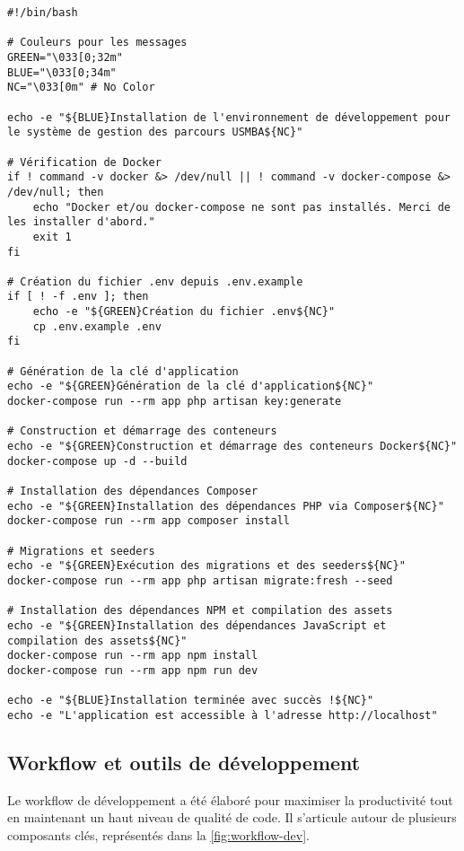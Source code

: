 \documentclass[french,12pt]{report} %
\begin{document}
\begin{lstlisting}[style=phpstyle, caption={setup.sh - Script d'initialisation de l'environnement}]
#!/bin/bash

# Couleurs pour les messages
GREEN="\033[0;32m"
BLUE="\033[0;34m"
NC="\033[0m" # No Color

echo -e "${BLUE}Installation de l'environnement de développement pour le système de gestion des parcours USMBA${NC}"

# Vérification de Docker
if ! command -v docker &> /dev/null || ! command -v docker-compose &> /dev/null; then
    echo "Docker et/ou docker-compose ne sont pas installés. Merci de les installer d'abord."
    exit 1
fi

# Création du fichier .env depuis .env.example
if [ ! -f .env ]; then
    echo -e "${GREEN}Création du fichier .env${NC}"
    cp .env.example .env
fi

# Génération de la clé d'application
echo -e "${GREEN}Génération de la clé d'application${NC}"
docker-compose run --rm app php artisan key:generate

# Construction et démarrage des conteneurs
echo -e "${GREEN}Construction et démarrage des conteneurs Docker${NC}"
docker-compose up -d --build

# Installation des dépendances Composer
echo -e "${GREEN}Installation des dépendances PHP via Composer${NC}"
docker-compose run --rm app composer install

# Migrations et seeders
echo -e "${GREEN}Exécution des migrations et des seeders${NC}"
docker-compose run --rm app php artisan migrate:fresh --seed

# Installation des dépendances NPM et compilation des assets
echo -e "${GREEN}Installation des dépendances JavaScript et compilation des assets${NC}"
docker-compose run --rm app npm install
docker-compose run --rm app npm run dev

echo -e "${BLUE}Installation terminée avec succès !${NC}"
echo -e "L'application est accessible à l'adresse http://localhost"
\end{lstlisting}

\subsection{Workflow et outils de développement}

Le workflow de développement a été élaboré pour maximiser la productivité tout en maintenant un haut niveau de qualité de code. Il s'articule autour de plusieurs composants clés, représentés dans la \autoref{fig:workflow-dev}.
\end{document}
